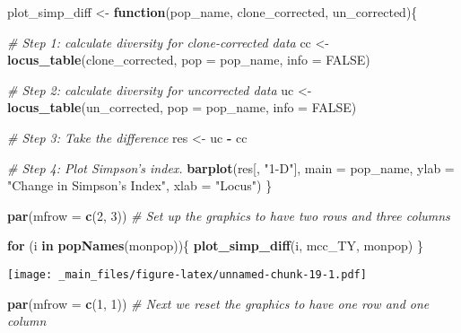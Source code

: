 \documentclass[12pt,]{krantz}
\newenvironment{Shaded}{\begin{snugshade}}{\end{snugshade}}
\newcommand{\KeywordTok}[1]{\textcolor[rgb]{0.27,0.27,0.27}{\textbf{#1}}}
\newcommand{\DataTypeTok}[1]{\textcolor[rgb]{0.27,0.27,0.27}{#1}}
\newcommand{\DecValTok}[1]{\textcolor[rgb]{0.06,0.06,0.06}{#1}}
\newcommand{\StringTok}[1]{\textcolor[rgb]{0.5,0.5,0.5}{#1}}
\newcommand{\CommentTok}[1]{\textcolor[rgb]{0.56,0.35,0.01}{\textit{#1}}}
\newcommand{\OtherTok}[1]{\textcolor[rgb]{0.56,0.35,0.01}{#1}}
\newcommand{\ControlFlowTok}[1]{\textcolor[rgb]{0.13,0.29,0.53}{\textbf{#1}}}
\newcommand{\OperatorTok}[1]{\textcolor[rgb]{0.81,0.36,0.00}{\textbf{#1}}}
\newcommand{\NormalTok}[1]{#1}
\theoremstyle{definition}
\theoremstyle{definition}
\theoremstyle{definition}
\theoremstyle{remark}
\begin{document}
\begin{Shaded}
\begin{Highlighting}[]
\NormalTok{plot_simp_diff <-}\StringTok{ }\ControlFlowTok{function}\NormalTok{(pop_name, clone_corrected, un_corrected)\{}

  \CommentTok{# Step 1: calculate diversity for clone-corrected data}
\NormalTok{  cc <-}\StringTok{ }\KeywordTok{locus_table}\NormalTok{(clone_corrected, }\DataTypeTok{pop =}\NormalTok{ pop_name, }\DataTypeTok{info =} \OtherTok{FALSE}\NormalTok{)}

  \CommentTok{# Step 2: calculate diversity for uncorrected data}
\NormalTok{  uc <-}\StringTok{ }\KeywordTok{locus_table}\NormalTok{(un_corrected, }\DataTypeTok{pop =}\NormalTok{ pop_name, }\DataTypeTok{info =} \OtherTok{FALSE}\NormalTok{)}

  \CommentTok{# Step 3: Take the difference}
\NormalTok{  res <-}\StringTok{ }\NormalTok{uc }\OperatorTok{-}\StringTok{ }\NormalTok{cc}

  \CommentTok{# Step 4: Plot Simpson's index.}
  \KeywordTok{barplot}\NormalTok{(res[, }\StringTok{"1-D"}\NormalTok{], }\DataTypeTok{main =}\NormalTok{ pop_name, }\DataTypeTok{ylab =} \StringTok{"Change in Simpson's Index"}\NormalTok{, }\DataTypeTok{xlab =} \StringTok{"Locus"}\NormalTok{)}
\NormalTok{\}}
\end{Highlighting}
\end{Shaded}

\begin{Shaded}
\begin{Highlighting}[]
\KeywordTok{par}\NormalTok{(}\DataTypeTok{mfrow =} \KeywordTok{c}\NormalTok{(}\DecValTok{2}\NormalTok{, }\DecValTok{3}\NormalTok{)) }\CommentTok{# Set up the graphics to have two rows and three columns}

\ControlFlowTok{for}\NormalTok{ (i }\ControlFlowTok{in} \KeywordTok{popNames}\NormalTok{(monpop))\{}
  \KeywordTok{plot_simp_diff}\NormalTok{(i, mcc_TY, monpop)}
\NormalTok{\}}
\end{Highlighting}
\end{Shaded}

\texttt{[image: \_main\_files/figure-latex/unnamed-chunk-19-1.pdf]}

\begin{Shaded}
\begin{Highlighting}[]
\KeywordTok{par}\NormalTok{(}\DataTypeTok{mfrow =} \KeywordTok{c}\NormalTok{(}\DecValTok{1}\NormalTok{, }\DecValTok{1}\NormalTok{)) }\CommentTok{# Next we reset the graphics to have one row and one column}
\end{Highlighting}
\end{Shaded}
\end{document}
